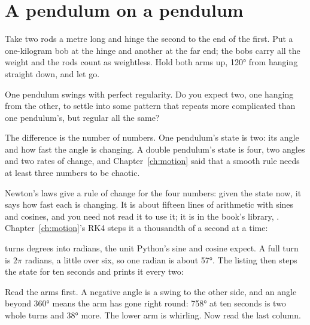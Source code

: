 \section{A pendulum on a pendulum}
\label{sec:ch13-double}

\noindent
Take two rods a metre long and hinge the second to the end of the first. Put
a one-kilogram bob at the hinge and another at the far end; the bobs carry
all the weight and the rods count as weightless. Hold both arms up,
120° from hanging straight down, and let go.

\begin{think}
One pendulum swings with perfect regularity. Do you expect two, one hanging
from the other, to settle into some pattern that repeats \dash{} more
complicated than one pendulum's, but regular all the same?
\end{think}
The difference is the number of numbers. One pendulum's state is two: its
angle and how fast the angle is changing. A double pendulum's state is four,
two angles and two rates of change, and Chapter~\ref{ch:motion} said that a
smooth rule needs at least three numbers to be chaotic.

Newton's laws give a rule of change for the four numbers: given the state
now, it says how fast each is changing. It is about fifteen lines of
arithmetic with sines and cosines, and you need not read it to use it; it is
 in the book's library, .
Chapter~\ref{ch:motion}'s RK4 steps it a thousandth of a second at a time:


\noindent
{} turns degrees into radians, the unit Python's sine and
cosine expect. A full turn is $2\pi$ radians, a little over six, so one
radian is about 57°. The listing then steps the state for ten seconds and
prints it every two:



\noindent
Read the arms first. A negative angle is a swing to the other side, and an
angle beyond 360° means the arm has gone right round: 758° at ten seconds is
two whole turns and 38° more. The lower arm is whirling. Now read the last
column.

